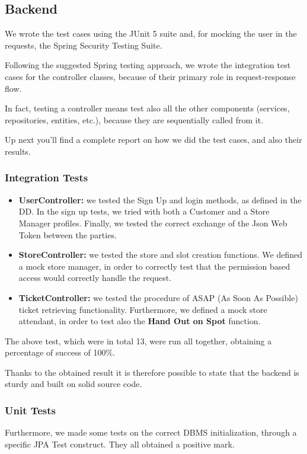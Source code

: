 \documentclass[table, 12pt]{article}
\begin{document}
\subsection{Backend}
We wrote the test cases using the JUnit 5 suite and, for mocking the user in the requests, the Spring Security Testing Suite.

Following the suggested Spring testing approach, we wrote the integration test cases for the controller classes, because of their primary role in request-response flow.

In fact, testing a controller means test also all the other components (services, repositories, entities, etc.), because they are sequentially called from it.

Up next you'll find a complete report on how we did the test cases, and also their results.

\subsubsection*{Integration Tests}
\begin{itemize}
    \item \textbf{UserController:} we tested the Sign Up and login methods, as defined in the DD. In the sign up tests, we tried with both a Customer and a Store Manager profiles. Finally, we tested the correct exchange of the Json Web Token between the parties.
    \item \textbf{StoreController:} we tested the store and slot creation functions. We defined a mock store manager, in order to correctly test that the permission based access would correctly handle the request.
    \item \textbf{TicketController:} we tested the procedure of ASAP (As Soon As Possible) ticket retrieving functionality. Furthermore, we defined a mock store attendant, in order to test also the \textbf{Hand Out on Spot} function.
\end{itemize}

The above test, which were in total 13, were run all together, obtaining a percentage of success of 100\%.

Thanks to the obtained result it is therefore possible to state that the backend is sturdy and built on solid source code.

\subsubsection*{Unit Tests}
Furthermore, we made some tests on the correct DBMS initialization, through a specific JPA Test construct. They all obtained a positive mark.
\end{document}
